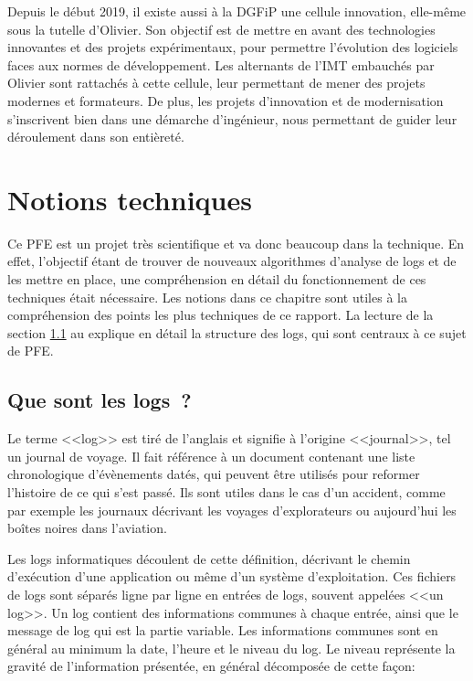 \documentclass[openany, 11pt]{memoir}
\begin{document}
\bigskip
Depuis le début 2019, il existe aussi à la DGFiP une cellule innovation, elle-même sous la tutelle d'Olivier. Son objectif est de mettre en avant des technologies innovantes et des projets expérimentaux, pour permettre l'évolution des logiciels faces aux normes de développement. Les alternants de l'IMT embauchés par Olivier sont rattachés à cette cellule, leur permettant de mener des projets modernes et formateurs. De plus, les projets d'innovation et de modernisation s'inscrivent bien dans une démarche d'ingénieur, nous permettant de guider leur déroulement dans son entièreté.

\newpage
\chapter{Notions techniques}

Ce PFE est un projet très scientifique et va donc beaucoup dans la technique. En effet, l'objectif étant de trouver de nouveaux algorithmes d'analyse de \glspl{log} et de les mettre en place, une compréhension en détail du fonctionnement de ces techniques était nécessaire. Les notions dans ce chapitre sont utiles à la compréhension des points les plus techniques de ce rapport. La lecture de la section \ref{logs} au explique en détail la structure des logs, qui sont centraux à ce sujet de PFE.


\section{Que sont les logs~?}
\label{logs}

Le terme <<log>> est tiré de l'anglais et signifie à l'origine <<journal>>, tel un journal de voyage. Il fait référence à un document contenant une liste chronologique d'évènements datés, qui peuvent être utilisés pour reformer l'histoire de ce qui s'est passé. Ils sont utiles dans le cas d'un accident, comme par exemple les journaux décrivant les voyages d'explorateurs ou aujourd'hui les boîtes noires dans l'aviation.

Les logs informatiques découlent de cette définition, décrivant le chemin d'exécution d'une application ou même d'un système d'exploitation. Ces fichiers de logs sont séparés ligne par ligne en entrées de logs, souvent appelées <<un log>>. Un log contient des informations communes à chaque entrée, ainsi que le message de log qui est la partie variable. Les informations communes sont en général au minimum la date, l'heure et le niveau du log. Le niveau représente la gravité de l'information présentée, en général décomposée de cette façon:
\end{document}
